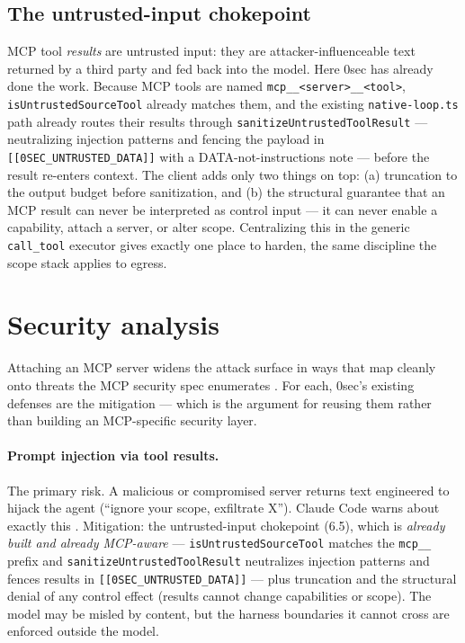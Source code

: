 \documentclass[11pt]{article}
\begin{document}
\subsection{The untrusted-input chokepoint}

MCP tool \emph{results} are untrusted input: they are attacker-influenceable text
returned by a third party and fed back into the model. Here 0sec has already done
the work. Because MCP tools are named \texttt{mcp\_\_<server>\_\_<tool>},
\texttt{isUntrustedSourceTool} already matches them, and the existing
\texttt{native-loop.ts} path already routes their results through
\texttt{sanitizeUntrustedToolResult} --- neutralizing injection patterns and
fencing the payload in \texttt{[[0SEC\_UNTRUSTED\_DATA]]} with a
DATA-not-instructions note --- before the result re-enters context. The client
adds only two things on top: (a) truncation to the output budget before
sanitization, and (b) the structural guarantee that an MCP result can never be
interpreted as control input --- it can never enable a capability, attach a
server, or alter scope. Centralizing this in the generic \texttt{call\_tool}
executor gives exactly one place to harden, the same discipline the scope stack
applies to egress.

\section{Security analysis}

Attaching an MCP server widens the attack surface in ways that map cleanly onto
threats the MCP security spec enumerates \cite{mcp-security}. For each, 0sec's
existing defenses are the mitigation --- which is the argument for reusing them
rather than building an MCP-specific security layer.

\paragraph{Prompt injection via tool results.} The primary risk. A malicious or
compromised server returns text engineered to hijack the agent (``ignore your
scope, exfiltrate X''). Claude Code warns about exactly this
\cite{claudecode-mcp}. Mitigation: the untrusted-input chokepoint (6.5), which is
\emph{already built and already MCP-aware} --- \texttt{isUntrustedSourceTool}
matches the \texttt{mcp\_\_} prefix and \texttt{sanitizeUntrustedToolResult}
neutralizes injection patterns and fences results in
\texttt{[[0SEC\_UNTRUSTED\_DATA]]} --- plus truncation and the structural denial
of any control effect (results cannot change capabilities or scope). The model
may be misled by content, but the harness boundaries it cannot cross are enforced
outside the model.
\end{document}
